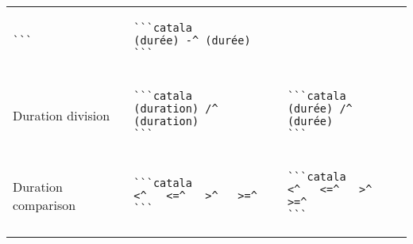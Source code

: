 \documentclass[a3paper,landscape]{article}
\begin{document}
\begin{multicols*}{2}
\begin{center}
\begin{tabular}{p{}p{}p{}}
\begin{verbatim}
```
\end{verbatim}
\vspace*{-1.75em}
&
\vspace*{-1.75em}
\begin{verbatim}
```catala
(durée) -^ (durée)
```
\end{verbatim}
\vspace*{-1.75em}
\\
Duration division&
\vspace*{-1.75em}
\begin{verbatim}
```catala
(duration) /^ (duration)
```
\end{verbatim}
\vspace*{-1.75em}
&
\vspace*{-1.75em}
\begin{verbatim}
```catala
(durée) /^ (durée)
```
\end{verbatim}
\vspace*{-1.75em}
\\
Duration comparison&
\vspace*{-1.75em}
\begin{verbatim}
```catala
<^   <=^   >^   >=^
```
\end{verbatim}
\vspace*{-1.75em}
&
\vspace*{-1.75em}
\begin{verbatim}
```catala
<^   <=^   >^   >=^
```
\end{verbatim}
\vspace*{-1.75em}
\\
\bottomrule
\end{tabular}
\end{center}



\end{multicols*}
\end{document}
